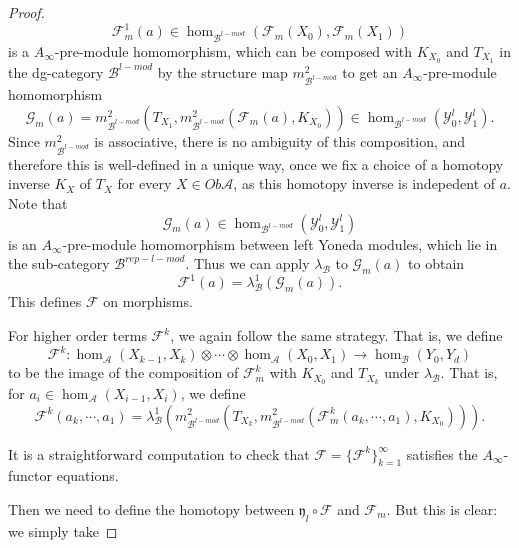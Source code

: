 \documentclass{amsart}
\numberwithin{equation}{section}
\numberwithin{figure}{section}
\begin{document}
\begin{proof}
\begin{equation*}
\mathcal{F}_{m}^{1}(a) \in \hom_{\mathcal{B}^{l-mod}}(\mathcal{F}_{m}(X_{0}), \mathcal{F}_{m}(X_{1}))
\end{equation*}
is a $A_{\infty}$-pre-module homomorphism, which can be composed with $K_{X_{0}}$ and $T_{X_{1}}$ in the dg-category $\mathcal{B}^{l-mod}$ by the structure map $m^{2}_{\mathcal{B}^{l-mod}}$ to get an $A_{\infty}$-pre-module homomorphism
\begin{equation}
\mathcal{G}_{m}(a) = m^{2}_{\mathcal{B}^{l-mod}}(T_{X_{1}}, m^{2}_{\mathcal{B}^{l-mod}}(\mathcal{F}_{m}(a), K_{X_{0}})) \in \hom_{\mathcal{B}^{l-mod}}(\mathcal{Y}_{0}^{l}, \mathcal{Y}_{1}^{l}).
\end{equation}
Since $m^{2}_{\mathcal{B}^{l-mod}}$ is associative, there is no ambiguity of this composition, and therefore this is well-defined in a unique way, once we fix a choice of a homotopy inverse $K_{X}$ of $T_{X}$ for every $X \in Ob\mathcal{A}$, as this homotopy inverse is indepedent of $a$. Note that
\begin{equation*}
\mathcal{G}_{m}(a) \in \hom_{\mathcal{B}^{l-mod}}(\mathcal{Y}_{0}^{l}, \mathcal{Y}_{1}^{l})
\end{equation*}
is an $A_{\infty}$-pre-module homomorphism between left Yoneda modules, which lie in the sub-category $\mathcal{B}^{rep-l-mod}$. Thus we can apply $\lambda_{\mathcal{B}}$ to $\mathcal{G}_{m}(a)$ to obtain
\begin{equation}
\mathcal{F}^{1}(a) = \lambda_{\mathcal{B}}^{1}(\mathcal{G}_{m}(a)).
\end{equation}
This defines $\mathcal{F}$ on morphisms. \par
	For higher order terms $\mathcal{F}^{k}$, we again follow the same strategy. That is, we define
\begin{equation}
\mathcal{F}^{k}: \hom_{\mathcal{A}}(X_{k-1}, X_{k}) \otimes \cdots \otimes \hom_{\mathcal{A}}(X_{0}, X_{1}) \to \hom_{\mathcal{B}}(Y_{0}, Y_{d})
\end{equation}
to be the image of the composition of $\mathcal{F}_{m}^{k}$ with $K_{X_{0}}$ and $T_{X_{k}}$ under $\lambda_{\mathcal{B}}$. That is, for $a_{i} \in \hom_{\mathcal{A}}(X_{i-1}, X_{i})$, we define
\begin{equation}
\mathcal{F}^{k}(a_{k}, \cdots, a_{1}) = \lambda_{\mathcal{B}}^{1}(m^{2}_{\mathcal{B}^{l-mod}}(T_{X_{k}}, m^{2}_{\mathcal{B}^{l-mod}}(\mathcal{F}_{m}^{k}(a_{k}, \cdots, a_{1}), K_{X_{0}}))).
\end{equation} \par
	It is a straightforward computation to check that $\mathcal{F} = \{\mathcal{F}^{k}\}_{k=1}^{\infty}$ satisfies the $A_{\infty}$-functor equations. \par
	Then we need to define the homotopy between $\mathfrak{y}_{l} \circ \mathcal{F}$ and $\mathcal{F}_{m}$. But this is clear: we simply take

\end{proof}
\end{document}
